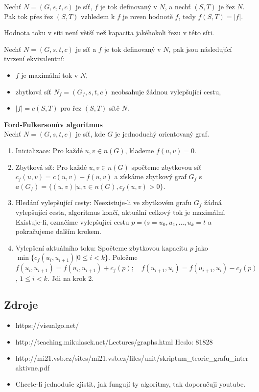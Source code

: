 \begin{theorem}
Nechť $N=(G,s,t,c)$ je síť, $f$ je tok definovaný v $N$, a nechť $(S,T)$ je řez $N$. Pak tok přes řez $(S,T)$ vzhledem k $f$ je roven hodnotě $f$, tedy $f(S,T) = |f|$.
\end{theorem}

\begin{theorem}
Hodnota toku v síti není větší než kapacita jakéhokoli řezu v této síti.
\end{theorem}

\begin{theorem}
    Nechť $N=(G,s,t,c)$ je síť a $f$ je tok definovaný v $N$, pak jsou následující tvrzení ekvivalentní:
    \begin{itemize}
        \item $f$ je maximální tok v $N$,
        \item zbytková síť $N_f = (G_f, s, t, c)$ neobsahuje žádnou vylepšující cestu,
        \item $|f| = c(S,T)$ pro řez $(S,T)$ sítě $N$.
    \end{itemize}
\end{theorem}

\textbf{Ford-Fulkersonův algoritmus}\\
Nechť $N=(G,s,t,c)$ je síť, kde $G$ je jednoduchý orientovaný graf.
\begin{enumerate}
    \item Inicializace: Pro každé $u, v \in n(G)$, klademe $f(u,v) = 0$.
    \item Zbytková síť: Pro každé $u, v \in n(G)$ spočteme zbytkovou síť $c_f(u,v) = c(u,v) - f(u,v)$ a získáme zbytkový graf $G_f$ s $a(G_f) = \{ (u,v) | u,v \in n(G), c_f(u,v) > 0 \}$.    
    \item Hledání vylepšující cesty: Neexistuje-li ve zbytkovém grafu $G_f$ žádná vylepšující cesta, algoritmus končí, aktuální celkový tok je maximální. Existuje-li, označíme vylepšující cestu $p = (s = u_0, u_1, \ldots, u_k = t$ a pokračujeme dalším krokem.
    \item Vylepšení aktuálního toku: Spočteme zbytkovou kapacitu $p$ jako $\min \{ c_f(u_i, u_{i+1}) | 0 \leq i < k \}$. Položme $f(u_i,u_{i+1})=f(u_i,u_{i+1})+c_f(p);\quad f(u_{i+1},u_i)=f(u_{i+1},u_i)-c_f(p)$, $1 \leq i < k$. Jdi na krok 2.
\end{enumerate}

\subsection{Zdroje}
\begin{itemize}
    \item https://visualgo.net/ 
    \item http://teaching.mikulasek.net/Lectures/graphs.html Heslo: 81828
    \item http://mi21.vsb.cz/sites/mi21.vsb.cz/files/unit/skriptum\_teorie\_grafu\_interaktivne.pdf
    \item Chcete-li jednoduše zjistit, jak fungují ty algoritmy, tak doporučuji youtube.
\end{itemize}

